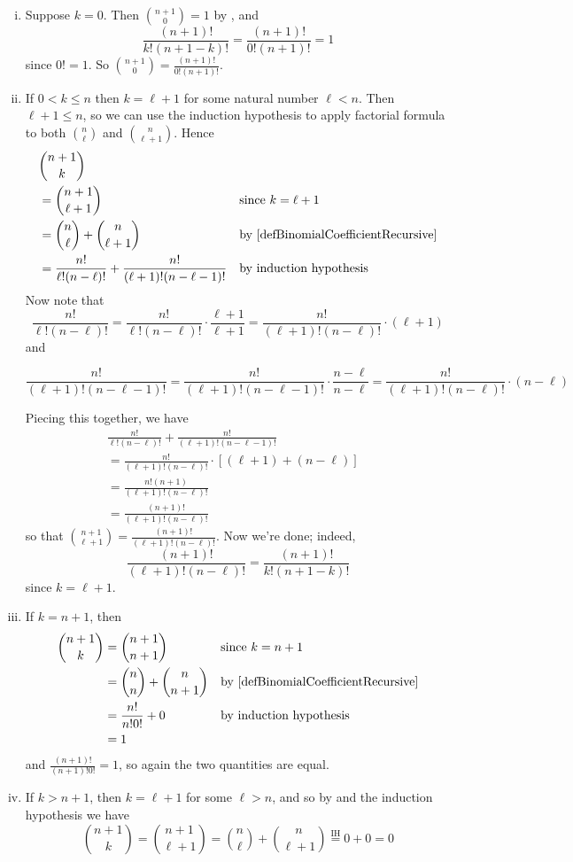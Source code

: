 \begin{cproof}
\begin{itemize}
\begin{enumerate}[(i)]
\item Suppose $k=0$. Then $\binom{n+1}{0} = 1$ by , and
\[ \frac{(n+1)!}{k!(n+1-k)!} = \frac{(n+1)!}{0!(n+1)!} = 1 \]
since $0!=1$. So $\binom{n+1}{0} = \frac{(n+1)!}{0!(n+1)!}$.
\item If $0 < k \le n$ then $k=\ell+1$ for some natural number $\ell < n$. Then $\ell+1 \le n$, so we can use the induction hypothesis to apply factorial formula to both $\binom{n}{\ell}$ and $\binom{n}{\ell+1}$. Hence
\begin{align*}
&\binom{n+1}{k} && \\
&= \binom{n+1}{\ell+1} && \text{since $k=\ell+1$} \\
&= \binom{n}{\ell} + \binom{n}{\ell+1} && \text{by \Cref{defBinomialCoefficientRecursive}} \\
&= \frac{n!}{\ell!(n-\ell)!} + \frac{n!}{(\ell+1)!(n-\ell-1)!} && \text{by induction hypothesis}
\end{align*}
Now note that
\[ \frac{n!}{\ell!(n-\ell)!} = \frac{n!}{\ell!(n-\ell)!} \cdot \frac{\ell+1}{\ell+1} = \frac{n!}{(\ell+1)!(n-\ell)!} \cdot (\ell+1) \]
and
\begin{center}
$\dfrac{n!}{(\ell+1)!(n-\ell-1)!} = \dfrac{n!}{(\ell+1)!(n-\ell-1)!} \cdot \dfrac{n-\ell}{n-\ell} = \dfrac{n!}{(\ell+1)!(n-\ell)!} \cdot (n-\ell)$
\end{center}

Piecing this together, we have
\begin{align*}
&\frac{n!}{\ell!(n-\ell)!} + \frac{n!}{(\ell+1)!(n-\ell-1)!} && \\
&= \frac{n!}{(\ell+1)!(n-\ell)!} \cdot [(\ell+1) + (n-\ell)] \\
&= \frac{n!(n+1)}{(\ell+1)!(n-\ell)!} && \\
&= \frac{(n+1)!}{(\ell+1)!(n-\ell)!}
\end{align*}
so that $\binom{n+1}{\ell+1} = \frac{(n+1)!}{(\ell+1)!(n-\ell)!}$. Now we're done; indeed,
\[ \frac{(n+1)!}{(\ell+1)!(n-\ell)!} = \frac{(n+1)!}{k!(n+1-k)!} \]
since $k=\ell+1$.
\item If $k=n+1$, then
\begin{align*}
\binom{n+1}{k} &= \binom{n+1}{n+1} && \text{since $k=n+1$} \\
&= \binom{n}{n} + \binom{n}{n+1} && \text{by \Cref{defBinomialCoefficientRecursive}} \\
&= \frac{n!}{n!0!} + 0 && \text{by induction hypothesis} \\
&= 1
\end{align*}
and $\frac{(n+1)!}{(n+1)!0!}=1$, so again the two quantities are equal.
\item If $k>n+1$, then $k=\ell+1$ for some $\ell > n$, and so by  and the induction hypothesis we have
\[ \binom{n+1}{k} = \binom{n+1}{\ell+1} = \binom{n}{\ell}+\binom{n}{\ell+1} \overset{\text{IH}}{=} 0+0 = 0 \]

\end{enumerate}
\end{itemize}
\end{cproof}

